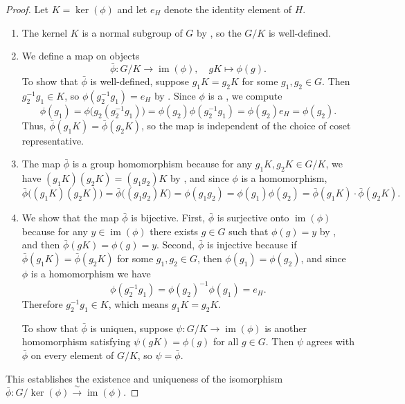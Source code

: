 \begin{proof}
    Let $K = \operatorname{ker}(\phi)$ and let $e_H$ denote the identity element of $H$.

    \begin{enumerate}
        \item The kernel $K$ is a normal subgroup of $G$ by , so the  $G/K$ is well-defined.

        \item We define a map on objects
        $$\bar{\phi} : G/K \longrightarrow \operatorname{im}(\phi), \quad gK \longmapsto \phi(g).$$
        To show that $\bar{\phi}$ is well-defined, suppose $g_1 K = g_2 K$ for some $g_1, g_2 \in G$. Then $g_2^{-1} g_1 \in K$, so $\phi(g_2^{-1} g_1) = e_H$ by . Since $\phi$ is a , we compute
        $$\phi(g_1) = \phi\bigl(g_2 (g_2^{-1} g_1)\bigr) = \phi(g_2) \phi(g_2^{-1} g_1) = \phi(g_2) e_H = \phi(g_2).$$
        Thus, $\bar{\phi}(g_1 K) = \bar{\phi}(g_2 K)$, so the map is independent of the choice of coset representative.

        \item The map $\bar{\phi}$ is a group homomorphism because for any $g_1 K, g_2 K \in G/K$, we have $(g_1 K)(g_2 K) = (g_1 g_2)K$ by , and since $\phi$ is a homomorphism,
        $$\bar{\phi}\bigl((g_1 K)(g_2 K)\bigr) = \bar{\phi}\bigl((g_1 g_2)K\bigr) = \phi(g_1 g_2) = \phi(g_1) \phi(g_2) = \bar{\phi}(g_1 K) \cdot \bar{\phi}(g_2 K).$$

        \item We show that the map $\bar{\phi}$ is bijective. First, $\bar{\phi}$ is surjective onto $\operatorname{im}(\phi)$ because for any $y \in \operatorname{im}(\phi)$ there exists $g \in G$ such that $\phi(g) = y$ by , and then $\bar{\phi}(gK) = \phi(g) = y$. Second, $\bar{\phi}$ is injective because if $\bar{\phi}(g_1 K) = \bar{\phi}(g_2 K)$ for some $g_1, g_2 \in G$, then $\phi(g_1) = \phi(g_2)$, and since $\phi$ is a homomorphism we have
        $$\phi(g_2^{-1} g_1) = \phi(g_2)^{-1} \phi(g_1) = e_H.$$
        Therefore $g_2^{-1} g_1 \in K$, which means $g_1 K = g_2 K$.

        To show that $\bar{\phi}$ is uniquen, suppose $\psi : G/K \to \operatorname{im}(\phi)$ is another homomorphism satisfying $\psi(gK) = \phi(g)$ for all $g \in G$. Then $\psi$ agrees with $\bar{\phi}$ on every element of $G/K$, so $\psi = \bar{\phi}$.
    \end{enumerate}

    This establishes the existence and uniqueness of the isomorphism $\bar{\phi} : G/\operatorname{ker}(\phi) \xrightarrow{\,\sim\,} \operatorname{im}(\phi)$.
\end{proof}
